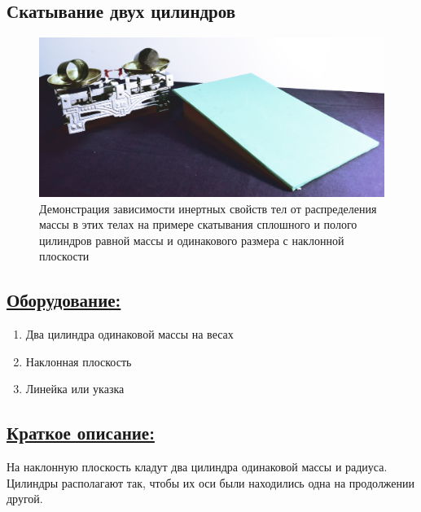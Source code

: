 \documentclass[14pt,a4paper,oneside]{extarticle}	%
\begin{document}
	
	

	\begin{center}
		\subsection*{Скатывание двух цилиндров}
	\end{center}
		

\begin{figure}[H] 	
	\centering 	
	\includegraphics[width=0.9\linewidth]{inclinedplane-1.png}
	\caption{Демонстрация зависимости инертных свойств тел от распределения массы в этих телах на примере скатывания сплошного и полого цилиндров равной массы и одинакового размера с наклонной плоскости}
	\label{inclinedplane-1}
\end{figure}
	
	\subsection*{\underline{Оборудование:}}

		\begin{enumerate}
			\item Два цилиндра одинаковой массы на весах
			\item Наклонная плоскость
			\item Линейка или указка
		\end{enumerate}
		
	\subsection*{\underline{Краткое описание:}}
		
	На наклонную плоскость кладут два цилиндра одинаковой массы и радиуса.
	Цилиндры располагают так, чтобы их оси были находились одна на продолжении другой.
	
\end{document}
